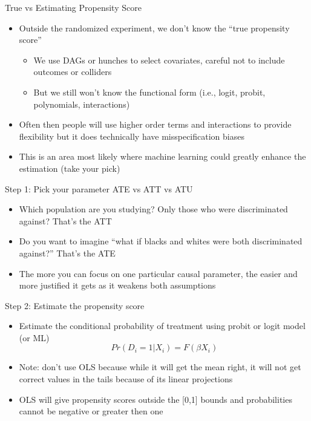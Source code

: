 \documentclass{beamer}
\begin{document}
\begin{frame}{True vs Estimating Propensity Score}


\begin{itemize}
\item Outside the randomized experiment, we don't know the ``true propensity score''
	\begin{itemize}
	\item We use DAGs or hunches to select covariates, careful not to include outcomes or colliders
	\item But we still won't know the functional form (i.e., logit, probit, polynomials, interactions)
	\end{itemize}
\item Often then people will use higher order terms and interactions to provide flexibility but it does technically have misspecification biases
\item This is an area most likely where machine learning could greatly enhance the estimation (take your pick)
\end{itemize}

\end{frame}




\begin{frame}{Step 1: Pick your parameter ATE vs ATT vs ATU}

\begin{itemize}
	\item Which population are you studying?  Only those who were discriminated against?  That's the ATT
	\item Do you want to imagine ``what if blacks and whites were both discriminated against?'' That's the ATE
	\item The more you can focus on one particular causal parameter, the easier and more justified it gets as it weakens both assumptions
\end{itemize}

\end{frame}


\begin{frame}{Step 2: Estimate the propensity score}

		\begin{itemize}
		\item Estimate the conditional probability of treatment using probit or logit model (or ML) $$Pr(D_i=1|X_i) = F(\beta X_i)$$
			\item Note: don't use OLS because while it will get the mean right, it will not get correct values in the tails because of its linear projections
			\item OLS will give propensity scores outside the [0,1] bounds and probabilities cannot be negative or greater then one
		\end{itemize}
\end{frame}
\end{document}
